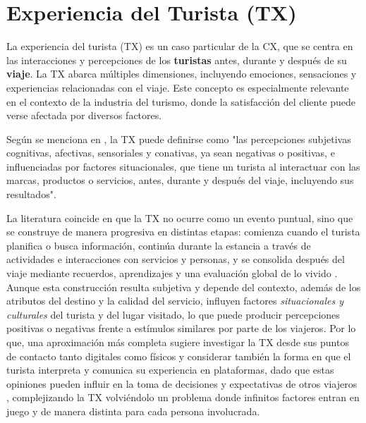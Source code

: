\section{Experiencia del Turista (TX)}
\label{sec:tx}

La experiencia del turista (TX) es un caso particular de la CX, que se centra en las interacciones y percepciones  de los \textbf{turistas} antes, durante y después de su \textbf{viaje}. La TX abarca múltiples dimensiones, incluyendo emociones, sensaciones y experiencias relacionadas con el viaje. Este concepto es especialmente relevante en el contexto de la industria del turismo, donde la satisfacción del cliente puede verse afectada por diversos factores.

Según se menciona en \parencite{rusu2023holistic}, la TX puede definirse como "las percepciones subjetivas cognitivas, afectivas, sensoriales y conativas, ya sean negativas o positivas, e influenciadas por factores situacionales, que tiene un turista al interactuar con las marcas, productos o servicios, antes, durante y después del viaje, incluyendo sus resultados".

La literatura coincide en que la TX no ocurre como un evento puntual, sino que se construye de manera progresiva en distintas etapas: comienza cuando el turista planifica o busca información, continúa durante la estancia a través de actividades e interacciones con servicios y personas, y se consolida después del viaje mediante recuerdos, aprendizajes y una evaluación global de lo vivido \parencite{rusu2023holistic}. Aunque esta construcción resulta subjetiva y depende del contexto, además de los atributos del destino y la calidad del servicio, influyen factores \textit{situacionales y culturales} del turista y del lugar visitado, lo que puede producir percepciones positivas o negativas frente a estímulos similares \parencite{ortiz2024slr} por parte de los viajeros. Por lo que, una aproximación más completa sugiere investigar la TX desde sus puntos de contacto tanto digitales como físicos y considerar también la forma en que el turista interpreta y comunica su experiencia en plataformas, dado que estas opiniones pueden influir en la toma de decisiones y expectativas de otros viajeros \parencite{rusu2023holistic,rusu2020hostels}, complejizando la TX volviéndolo un problema donde infinitos factores entran en juego y de manera distinta para cada persona involucrada.

